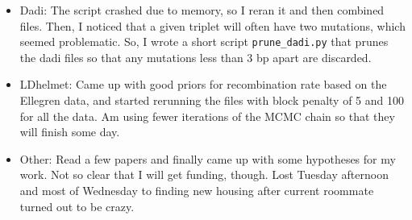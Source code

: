 \documentclass[idxtotoc,hyperref,openany,oneside]{labbook} %
\begin{document}
\begin{itemize}
\item Dadi: The script crashed due to memory, so I reran it and then combined files. Then, I noticed that a given triplet will often have two mutations, which seemed problematic. So, I wrote a short script \verb+prune_dadi.py+ that prunes the dadi files so that any mutations less than 3 bp apart are discarded.
\item LDhelmet: Came up with good priors for recombination rate based on the Ellegren data, and started rerunning the files with block penalty of 5 and 100 for all the data. Am using fewer iterations of the MCMC chain so that they will finish some day.
\item Other: Read a few papers and finally came up with some hypotheses for my work. Not so clear that I will get funding, though. Lost Tuesday afternoon and most of Wednesday to finding new housing after current roommate turned out to be crazy.
\end{itemize}
\end{document}
